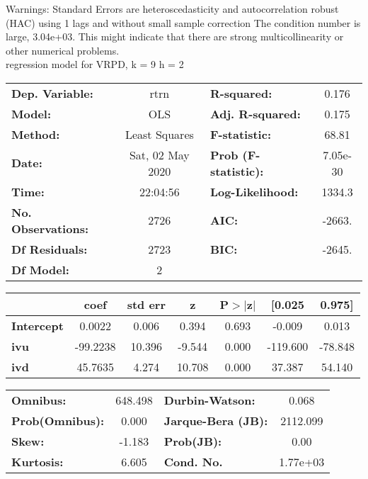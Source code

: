 Warnings: \newline
 [1] Standard Errors are heteroscedasticity and autocorrelation robust (HAC) using 1 lags and without small sample correction \newline
 [2] The condition number is large, 3.04e+03. This might indicate that there are \newline
 strong multicollinearity or other numerical problems.\\ 

regression model for VRPD, k = 9 h = 2\begin{center}
\begin{tabular}{lclc}
\toprule
\textbf{Dep. Variable:}    &       rtrn       & \textbf{  R-squared:         } &     0.176   \\
\textbf{Model:}            &       OLS        & \textbf{  Adj. R-squared:    } &     0.175   \\
\textbf{Method:}           &  Least Squares   & \textbf{  F-statistic:       } &     68.81   \\
\textbf{Date:}             & Sat, 02 May 2020 & \textbf{  Prob (F-statistic):} &  7.05e-30   \\
\textbf{Time:}             &     22:04:56     & \textbf{  Log-Likelihood:    } &    1334.3   \\
\textbf{No. Observations:} &        2726      & \textbf{  AIC:               } &    -2663.   \\
\textbf{Df Residuals:}     &        2723      & \textbf{  BIC:               } &    -2645.   \\
\textbf{Df Model:}         &           2      & \textbf{                     } &             \\
\bottomrule
\end{tabular}
\begin{tabular}{lcccccc}
                   & \textbf{coef} & \textbf{std err} & \textbf{z} & \textbf{P$> |$z$|$} & \textbf{[0.025} & \textbf{0.975]}  \\
\midrule
\textbf{Intercept} &       0.0022  &        0.006     &     0.394  &         0.693        &       -0.009    &        0.013     \\
\textbf{ivu}       &     -99.2238  &       10.396     &    -9.544  &         0.000        &     -119.600    &      -78.848     \\
\textbf{ivd}       &      45.7635  &        4.274     &    10.708  &         0.000        &       37.387    &       54.140     \\
\bottomrule
\end{tabular}
\begin{tabular}{lclc}
\textbf{Omnibus:}       & 648.498 & \textbf{  Durbin-Watson:     } &    0.068  \\
\textbf{Prob(Omnibus):} &   0.000 & \textbf{  Jarque-Bera (JB):  } & 2112.099  \\
\textbf{Skew:}          &  -1.183 & \textbf{  Prob(JB):          } &     0.00  \\
\textbf{Kurtosis:}      &   6.605 & \textbf{  Cond. No.          } & 1.77e+03  \\
\bottomrule
\end{tabular}
\end{center}

